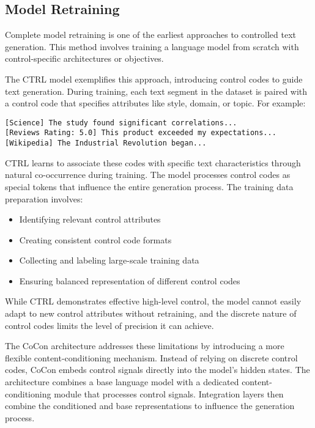 \subsection{Model Retraining}

Complete model retraining is one of the earliest approaches to controlled text generation.
This method involves training a language model from scratch with control-specific architectures or objectives.

The CTRL model \cite{keskar2019ctrlconditionaltransformerlanguage} exemplifies this approach, introducing control codes to guide text generation. During training, each text segment in the dataset is paired with a control code that specifies attributes like style, domain, or topic. For example:

\begin{verbatim}
[Science] The study found significant correlations...
[Reviews Rating: 5.0] This product exceeded my expectations...
[Wikipedia] The Industrial Revolution began...
\end{verbatim}

CTRL learns to associate these codes with specific text characteristics through natural co-occurrence during training. 
The model processes control codes as special tokens that influence the entire generation process. 
The training data preparation involves:

\begin{itemize}
   \item Identifying relevant control attributes
   \item Creating consistent control code formats
   \item Collecting and labeling large-scale training data
   \item Ensuring balanced representation of different control codes
\end{itemize}

While CTRL demonstrates effective high-level control, the model cannot easily adapt to new control attributes without retraining, and the discrete nature of control codes limits the level of precision it can achieve.

The CoCon architecture \cite{chan2022coconselfsupervisedapproachcontrolled} addresses these limitations by introducing a more flexible content-conditioning mechanism. 
Instead of relying on discrete control codes, CoCon embeds control signals directly into the model's hidden states. 
The architecture combines a base language model with a dedicated content-conditioning module that processes control signals. 
Integration layers then combine the conditioned and base representations to influence the generation process.

